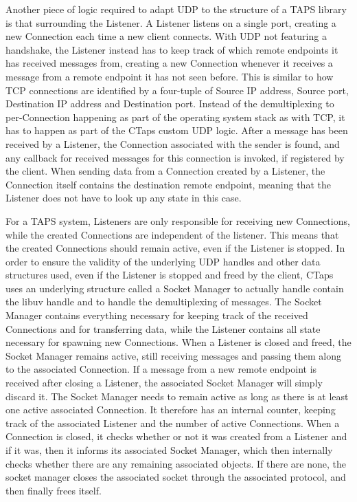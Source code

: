 Another piece of logic required to adapt UDP to the structure
of a TAPS library is that surrounding the Listener. A Listener
listens on a single  port, creating a new 
Connection each time a new client connects. With UDP not
featuring a handshake, the Listener instead has to keep track
of which remote endpoints it has received messages from, creating
a new Connection whenever it receives a message from a remote endpoint
it has not seen before. This is similar to how TCP connections
are identified by a four-tuple of Source IP address, Source port,
Destination IP address and Destination port. Instead of the
demultiplexing to per-Connection happening as part of the
operating system stack as with TCP, it has to happen as
part of the CTaps custom UDP logic. After a message has
been received by a Listener, the Connection associated with
the sender is found, and any callback for received messages
for this connection is invoked, if registered by the client.
When sending data from a Connection created by a Listener, the
Connection itself contains the destination remote endpoint,
meaning that the Listener does not have to look up any state
in this case. 

For a TAPS system, Listeners are only responsible for receiving new
Connections, while the created Connections are independent
of the listener. This means that the created Connections should
remain active, even if the Listener is stopped. In order to ensure
the validity of the underlying UDP handles and other data structures
used, even if the Listener is stopped and freed by the client, CTaps
uses an underlying structure called a Socket Manager to actually
handle contain the libuv handle and to handle the demultiplexing of
messages. The Socket Manager contains everything necessary for keeping
track of the received Connections and for transferring data, while the
Listener contains all state necessary for spawning new Connections.
When a Listener is closed and freed, the Socket Manager remains active,
still receiving messages and passing them along to the associated Connection.
If a message from a new remote endpoint is received after closing a
Listener, the associated Socket Manager will simply discard it. The
Socket Manager needs to remain active as long as there is at least
one active associated Connection. It therefore has an internal counter,
keeping track of the associated Listener and the number of active Connections.
When a Connection is closed, it checks whether or not it was created from a Listener
and if it was, then it informs its associated Socket Manager,
which then internally checks whether there are any remaining associated
objects. If there are none, the socket manager closes the associated socket
through the associated protocol, and then finally frees itself.

